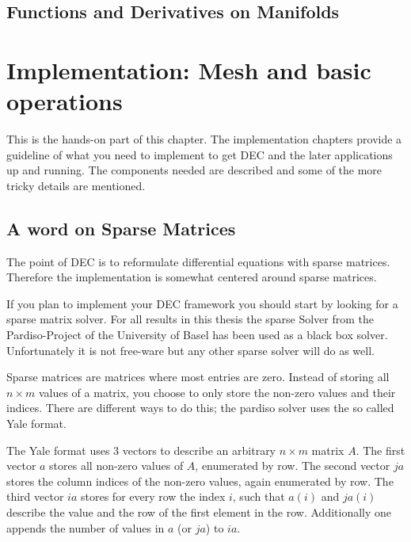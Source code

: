 \subsection{Functions and Derivatives on Manifolds}



\newpage
\section{Implementation: Mesh and basic operations}
This is the hands-on part of this chapter. The implementation chapters provide a guideline of what you need to implement to get DEC and the later applications up and running. The components needed are described and some of the more tricky details are mentioned.

\subsection{A word on Sparse Matrices}
The point of DEC is to reformulate differential equations with sparse matrices. Therefore the implementation is somewhat centered around sparse matrices.

If you plan to implement your DEC framework you should start by looking for a sparse matrix solver. For all results in this thesis the sparse Solver from the Pardiso-Project of the University of Basel has been used as a black box solver. Unfortunately it is not free-ware but any other sparse solver will do as well.

Sparse matrices are matrices where most entries are zero. Instead of storing all $n\times m$ values of a matrix, you choose to only store the non-zero values and their indices. There are different ways to do this; the pardiso solver uses the so called Yale format.

The Yale format uses 3 vectors to describe an arbitrary $n\times m$ matrix $A$. The first vector $a$ stores all non-zero values of $A$, enumerated by row. The second vector $ja$ stores the column indices of the non-zero values, again enumerated by row. The third vector $ia$ stores for every row the index $i$, such that $a(i)$ and $ja(i)$ describe the value and the row of the first element in the row. Additionally one appends the number of values in $a$ (or $ja$) to $ia$.

